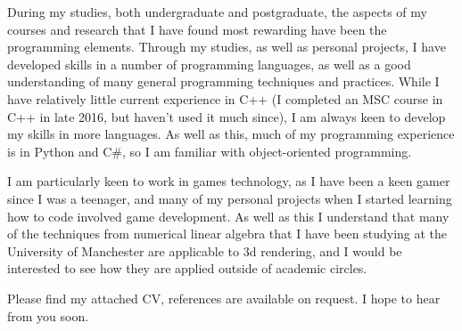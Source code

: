 \documentclass[11pt,a4paper,sans]{moderncv}        %
\begin{document}
During my studies, both undergraduate and postgraduate, the aspects of my courses and research that I have found most rewarding have been the programming elements. Through my studies, as well as personal projects, I have developed skills in a number of programming languages, as well as a good understanding of many general programming techniques and practices. While I have relatively little current experience in C++ (I completed an MSC course in C++ in late 2016, but haven't used it much since), I am always keen to develop my skills in more languages. As well as this, much of my programming experience is in Python and C\#, so I am familiar with object-oriented programming.

I am particularly keen to work in games technology, as I have been a keen gamer since I was a teenager, and many of my personal projects when I started learning how to code involved game development. As well as this I understand that many of the techniques from numerical linear algebra that I have been studying at the University of Manchester are applicable to 3d rendering, and I would be interested to see how they are applied outside of academic circles.

Please find my attached CV, references are available on request. I hope to hear from you soon.

\makeletterclosing

\end{document}
